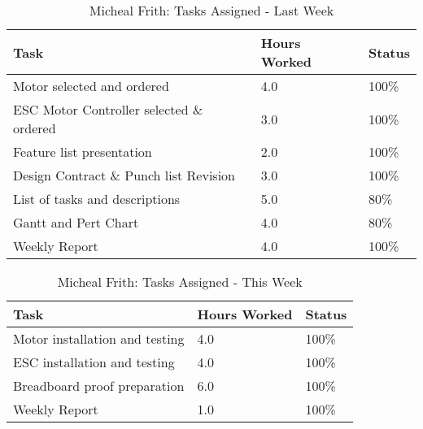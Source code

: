 \documentclass[12pt,compsoc]{IEEEtran}
\begin{document}
    \begin{table}[ht]
		\renewcommand{\arraystretch}{1.3}
		\caption{Micheal Frith: Tasks Assigned - Last Week}
		
		\label{Summary of Micheal Frith's activities: last week}
		
		\centering
		\begin{tabular}{p{5.5cm}|p{1cm}|p{1cm}}
		\hline
		\bfseries 	Task		 								& \bfseries Hours Worked	& \bfseries Status	\\
		\hline\hline
					Motor selected and ordered 					& 4.0						& 100\%				\\
					ESC Motor Controller selected \& ordered   	& 3.0		    			& 100\% 			\\
					Feature list presentation 					& 2.0						& 100\%				\\
					Design Contract \& Punch list Revision		& 3.0						& 100\%				\\
					List of tasks and descriptions				& 5.0						& 80\%				\\
					Gantt and Pert Chart						& 4.0						& 80\%				\\
					Weekly Report								& 4.0						& 100\%				\\
		\end{tabular}
	\end{table}

	\begin{table}[ht]
	\renewcommand{\arraystretch}{1.3}
		\caption{Micheal Frith: Tasks Assigned - This Week}
		
		\label{Summary of Micheal Frith's activities: this week}
		
		\centering
		\begin{tabular}{p{5.5cm}|p{1cm}|p{1cm}}
		\hline
		\bfseries 	Task		 							& \bfseries Hours Worked	& \bfseries Status	\\
		\hline\hline
					Motor installation and testing 			& 4.0						& 100\%				\\
					ESC installation and testing			& 4.0						& 100\%				\\
					Breadboard proof preparation			& 6.0						& 100\%				\\
					Weekly Report							& 1.0						& 100\%				\\
		\hline
		\end{tabular}
	\end{table}

\end{document}
